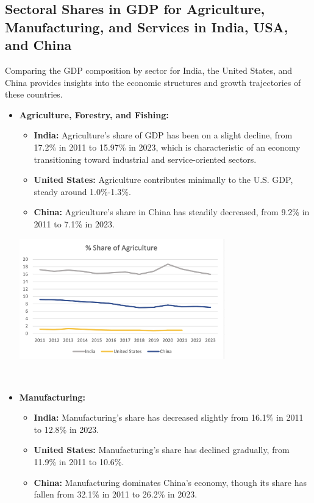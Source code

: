\documentclass[a4paper,12pt]{extarticle} %
\begin{document}
\subsection{Sectoral Shares in GDP for Agriculture, Manufacturing, and Services in India, USA, and China}
Comparing the GDP composition by sector for India, the United States, and China provides insights into the economic structures and growth trajectories of these countries.
\cite{wb}

\begin{itemize}
    \item \textbf{Agriculture, Forestry, and Fishing:}
    \begin{itemize}
        \item \textbf{India:} Agriculture’s share of GDP has been on a slight decline, from 17.2\% in 2011 to 15.97\% in 2023, which is characteristic of an economy transitioning toward industrial and service-oriented sectors. 
        \item \textbf{United States:} Agriculture contributes minimally to the U.S. GDP, steady around 1.0\%-1.3\%. 
        \item \textbf{China:} Agriculture’s share in China has steadily decreased, from 9.2\% in 2011 to 7.1\% in 2023.
    \end{itemize}

    \begin{center}
    \includegraphics[width=0.7\textwidth]{Q2/6.png} 
\end{center}\\

    
    \item \textbf{Manufacturing:}
    \begin{itemize}
        \item \textbf{India:} Manufacturing’s share has decreased slightly from 16.1\% in 2011 to 12.8\% in 2023.
        \item \textbf{United States:} Manufacturing’s share has declined gradually, from 11.9\% in 2011 to 10.6\%.
        \item \textbf{China:} Manufacturing dominates China’s economy, though its share has fallen from 32.1\% in 2011 to 26.2\% in 2023.
    \end{itemize}


\end{itemize}
\end{document}
